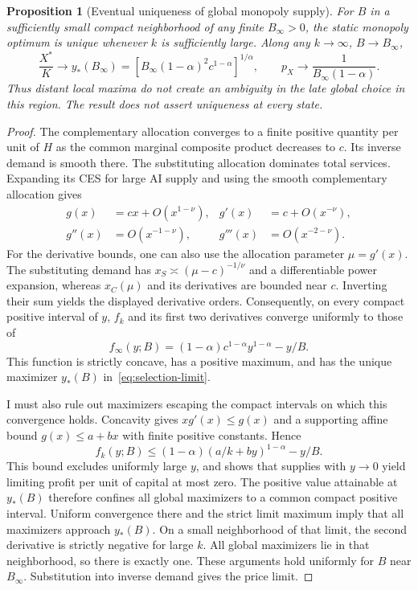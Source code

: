 \documentclass[11pt]{article}
\newtheorem{proposition}{Proposition}
\begin{document}
\begin{proposition}[Eventual uniqueness of global monopoly supply]
For $B$ in a sufficiently small compact neighborhood of any finite
$B_\infty>0$, the static monopoly optimum is unique whenever $k$ is
sufficiently large. Along any $k\to\infty$, $B\to B_\infty$,
\begin{equation}
 \frac{X^*}{K}\to y_*(B_\infty)
 =\left[B_\infty(1-\alpha)^2c^{1-\alpha}\right]^{1/\alpha},
 \qquad p_X\to\frac1{B_\infty(1-\alpha)}.
 \label{eq:selection-limit}
\end{equation}
Thus distant local maxima do not create an ambiguity in the late global
choice in this region. The result does not assert uniqueness at every state.
\end{proposition}
\begin{proof}
The complementary allocation converges to a finite positive quantity per
unit of $H$ as the common marginal composite product decreases to $c$.
Its inverse demand is smooth there. The substituting allocation dominates
total services. Expanding its CES for large AI supply and using the smooth
complementary allocation gives
\begin{align*}
 g(x)&=cx+O(x^{1-\nu}),&g'(x)&=c+O(x^{-\nu}),\\
 g''(x)&=O(x^{-1-\nu}),&g'''(x)&=O(x^{-2-\nu}).
\end{align*}
For the derivative bounds, one can also use the allocation parameter
$\mu=g'(x)$. The substituting demand has
$x_S\asymp(\mu-c)^{-1/\nu}$ and a differentiable power expansion,
whereas $x_C(\mu)$ and its derivatives are bounded near $c$.
Inverting their sum yields the displayed derivative orders.
Consequently, on every compact positive interval of $y$,
$f_k$ and its first two derivatives converge uniformly to those of
\begin{equation}
 f_\infty(y;B)=(1-\alpha)c^{1-\alpha}y^{1-\alpha}-y/B.
 \label{eq:selection-limit-objective}
\end{equation}
This function is strictly concave, has a positive maximum, and has the
unique maximizer $y_*(B)$ in~\eqref{eq:selection-limit}.

I must also rule out maximizers escaping the compact intervals on which
this convergence holds. Concavity gives $xg'(x)\leq g(x)$ and a supporting
affine bound $g(x)\leq a+bx$ with finite positive constants. Hence
\[
 f_k(y;B)\leq(1-\alpha)(a/k+by)^{1-\alpha}-y/B.
\]
This bound excludes uniformly large $y$, and shows that supplies with
$y\to0$ yield limiting profit per unit of capital at most zero.
The positive value attainable at $y_*(B)$ therefore confines all global
maximizers to a common compact positive interval. Uniform convergence
there and the strict limit maximum imply that all maximizers approach
$y_*(B)$. On a small neighborhood of that limit, the second derivative
is strictly negative for large $k$. All global maximizers lie in that
neighborhood, so there is exactly one. These arguments hold uniformly
for $B$ near $B_\infty$. Substitution into inverse demand gives the price limit.
\end{proof}
\end{document}
